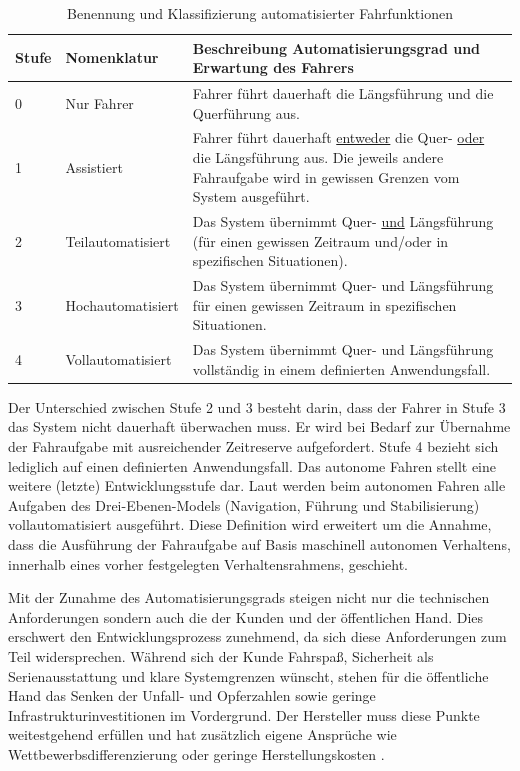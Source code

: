 \begin{table}[htpb]
	\scriptsize
	\caption[Benennung und Klassifizierung automatisierter Fahrfunktionen]{Benennung und Klassifizierung automatisierter Fahrfunktionen \parencite[S. 3]{Gasser.2011}}\label{tab:Automatisierungsgrad}
	\centering
	\begin{tabular}{l p{3cm} p{10cm}}
		\toprule
		Stufe & Nomenklatur & Beschreibung Automatisierungsgrad und Erwartung des Fahrers \\
		\midrule
		0 & Nur Fahrer & Fahrer führt dauerhaft die Längsführung und die Querführung aus. \\
		1 & Assistiert & Fahrer führt dauerhaft \underline{entweder} die Quer- \underline{oder} die Längsführung aus. Die jeweils andere Fahraufgabe wird in gewissen Grenzen vom System ausgeführt. \\
		2 & Teilautomatisiert & Das System übernimmt Quer- \underline{und} Längsführung (für einen gewissen Zeitraum und/oder in spezifischen Situationen). \\
		3 & Hochautomatisiert & Das System übernimmt Quer- und Längsführung für einen gewissen Zeitraum in spezifischen Situationen. \\
		4 & Vollautomatisiert & Das System übernimmt Quer- und Längsführung vollständig in einem definierten Anwendungsfall. \\
		\bottomrule
	\end{tabular}
\end{table}

Der Unterschied zwischen Stufe 2 und 3 besteht darin, dass der Fahrer in Stufe 3 das System nicht dauerhaft überwachen muss. Er wird bei Bedarf zur Übernahme der Fahraufgabe mit ausreichender Zeitreserve aufgefordert. Stufe 4 bezieht sich lediglich auf einen definierten Anwendungsfall. Das autonome Fahren stellt eine weitere (letzte) Entwicklungsstufe dar. Laut \Textcite[S. 34]{Maurer.2015} werden beim autonomen Fahren alle Aufgaben des Drei-Ebenen-Models (Navigation, Führung und Stabilisierung) vollautomatisiert ausgeführt. Diese Definition wird erweitert um die Annahme, dass die Ausführung der Fahraufgabe auf Basis maschinell autonomen Verhaltens, innerhalb eines vorher festgelegten Verhaltensrahmens, geschieht.

Mit der Zunahme des Automatisierungsgrads steigen nicht nur die technischen Anforderungen sondern auch die der Kunden und der öffentlichen Hand. Dies erschwert den Entwicklungsprozess zunehmend, da sich diese Anforderungen zum Teil widersprechen. Während sich der Kunde Fahrspaß, Sicherheit als Serienausstattung und klare Systemgrenzen wünscht, stehen für die öffentliche Hand das Senken der Unfall- und Opferzahlen sowie geringe Infrastrukturinvestitionen im Vordergrund. Der Hersteller muss diese Punkte weitestgehend erfüllen und hat zusätzlich eigene Ansprüche wie Wettbewerbsdifferenzierung oder geringe Herstellungskosten \parencite[S. 8]{Meitinger.2008}. %


